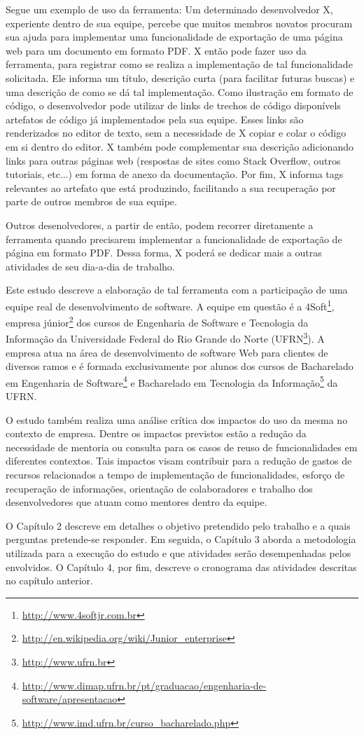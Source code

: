 Segue um exemplo de uso da ferramenta: Um determinado desenvolvedor X, experiente dentro de sua equipe, percebe que muitos membros novatos procuram sua ajuda para implementar uma funcionalidade de exportação de uma página web para um documento em formato PDF. X então pode fazer uso da ferramenta, para registrar como se realiza a implementação de tal funcionalidade solicitada. Ele informa um título, descrição curta (para facilitar futuras buscas) e uma descrição de como se dá tal implementação. Como ilustração em formato de código, o desenvolvedor pode utilizar de links de trechos de código disponívels artefatos de código já implementados pela sua equipe. Esses links são renderizados no editor de texto, sem a necessidade de X copiar e colar o código em si dentro do editor. X também pode complementar sua descrição adicionando links para outras páginas web (respostas de sites como Stack Overflow, outros tutoriais, etc...) em forma de anexo da documentação. Por fim, X informa tags relevantes ao artefato que está produzindo, facilitando a sua recuperação por parte de outros membros de sua equipe.

Outros desenolvedores, a partir de então, podem recorrer diretamente a ferramenta quando precisarem implementar a funcionalidade de exportação de página em formato PDF. Dessa forma, X poderá se dedicar mais a outras atividades de seu dia-a-dia de trabalho.

Este estudo descreve a elaboração de tal ferramenta com a participação de uma equipe real de desenvolvimento de software. A equipe em questão é a 4Soft\footnote{\url{http://www.4softjr.com.br}}, empresa júnior\footnote{\url{http://en.wikipedia.org/wiki/Junior_enterprise}} dos cursos de Engenharia de Software e Tecnologia da Informação da Universidade Federal do Rio Grande do Norte (UFRN\footnote{\url{http://www.ufrn.br}}). A empresa atua na área de desenvolvimento de software Web para clientes de diversos ramos e é formada exclusivamente por alunos dos cursos de Bacharelado em Engenharia de Software\footnote{\url{http://www.dimap.ufrn.br/pt/graduacao/engenharia-de-software/apresentacao}} e Bacharelado em Tecnologia da Informação\footnote{\url{http://www.imd.ufrn.br/curso_bacharelado.php}} da UFRN.

O estudo também realiza uma análise crítica dos impactos do uso da mesma no contexto de empresa. Dentre os impactos previstos estão a redução da necessidade de mentoria ou consulta para os casos de  reuso de funcionalidades em diferentes contextos. Tais impactos visam contribuir para a redução de gastos de recursos relacionados a tempo de implementação de funcionalidades, esforço de recuperação de informações, orientação de colaboradores e trabalho dos desenvolvedores que atuam como mentores dentro da equipe.


O Capítulo 2 descreve em detalhes o objetivo pretendido pelo trabalho e a quais perguntas pretende-se responder. Em seguida, o Capítulo 3 aborda a metodologia utilizada para a execução do estudo e que atividades serão desempenhadas pelos envolvidos. O Capítulo 4, por fim, descreve o cronograma das atividades descritas no capítulo anterior.
